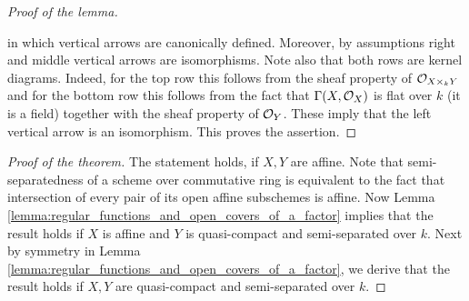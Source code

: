 \begin{proof}[Proof of the lemma]
\begin{center}
\end{center}
in which vertical arrows are canonically defined. Moreover, by assumptions right and middle vertical arrows are isomorphisms. Note also that both rows are kernel diagrams. Indeed, for the top row this follows from the sheaf property of ${\mathcal O}_{X\times_k Y}$ and for the bottom row this follows from the fact that $\Gamma(X,{\mathcal O}_X)$ is flat over $k$ (it is a field) together with the sheaf property of ${\mathcal O}_Y$. These imply that the left vertical arrow is an isomorphism. This proves the assertion.
\end{proof}

\begin{proof}[Proof of the theorem]
The statement holds, if $X,Y$ are affine. Note that semi-separatedness of a scheme over commutative ring is equivalent to the fact that intersection of every pair of its open affine subschemes is affine. Now Lemma \ref{lemma:regular_functions_and_open_covers_of_a_factor} implies that the result holds if $X$ is affine and $Y$ is quasi-compact and semi-separated over $k$. Next by symmetry in Lemma \ref{lemma:regular_functions_and_open_covers_of_a_factor}, we derive that the result holds if $X,Y$ are quasi-compact and semi-separated over $k$.
\end{proof}

